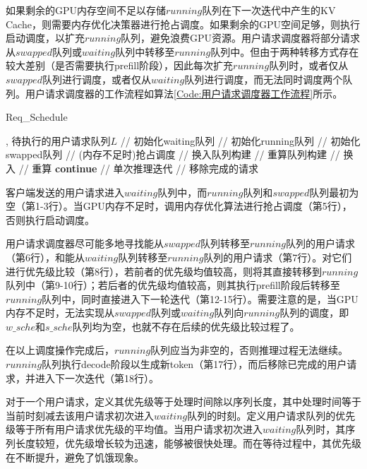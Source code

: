 如果剩余的GPU内存空间不足以存储$running$队列在下一次迭代中产生的KV Cache，则需要内存优化决策器进行抢占调度。如果剩余的GPU空间足够，则执行启动调度，以扩充$running$队列，避免浪费GPU资源。用户请求调度器将部分请求从$swapped$队列或$waiting$队列中转移至$running$队列中。但由于两种转移方式存在较大差别（是否需要执行prefill阶段），因此每次扩充$running$队列时，或者仅从$swapped$队列进行调度，或者仅从$waiting$队列进行调度，而无法同时调度两个队列。用户请求调度器的工作流程如算法\ref{Code:用户请求调度器工作流程}所示。

\begin{algorithm}
  \caption{Req\_Schedule}
  \label{Code:用户请求调度器工作流程}
  \small
  \begin{spacing}{1.25}
    \begin{algorithmic}[1]
      , {待执行的用户请求队列$L$}
        \hfill {// 初始化waiting队列}
       \hfill {// 初始化running队列}
       \hfill {// 初始化swapped队列}
          \hfill {// (内存不足时)抢占调度}
          \hfill {// 换入队列构建}
          \hfill {// 重算队列构建}
            \hfill {// 换入}
        \ELSE
            \hfill {// 重算}
          \STATE \textbf{continue}
        \ENDIF
         \hfill {// 单次推理迭代}
         \hfill {// 移除完成的请求}
      \ENDWHILE
    \end{algorithmic}
  \end{spacing}
\end{algorithm}

客户端发送的用户请求进入$waiting$队列中，而$running$队列和$swapped$队列最初为空（第1-3行）。当GPU内存不足时，调用内存优化算法进行抢占调度（第5行），否则执行启动调度。

用户请求调度器尽可能多地寻找能从$swapped$队列转移至$running$队列的用户请求（第6行），和能从$waiting$队列转移至$running$队列的用户请求（第7行）。对它们进行优先级比较（第8行），若前者的优先级均值较高，则将其直接转移到$running$队列中（第9-10行）；若后者的优先级均值较高，则其执行prefill阶段后转移至$running$队列中，同时直接进入下一轮迭代（第12-15行）。需要注意的是，当GPU内存不足时，无法实现从$swapped$队列或$waiting$队列向$running$队列的调度，即$w\_sche$和$s\_sche$队列均为空，也就不存在后续的优先级比较过程了。

在以上调度操作完成后，$running$队列应当为非空的，否则推理过程无法继续。$running$队列执行decode阶段以生成新token（第17行），而后移除已完成的用户请求，并进入下一次迭代（第18行）。

对于一个用户请求，定义其优先级等于处理时间除以序列长度，其中处理时间等于当前时刻减去该用户请求初次进入$waiting$队列的时刻。定义用户请求队列的优先级等于所有用户请求优先级的平均值。当用户请求初次进入$waiting$队列时，其序列长度较短，优先级增长较为迅速，能够被很快处理。而在等待过程中，其优先级在不断提升，避免了饥饿现象。
